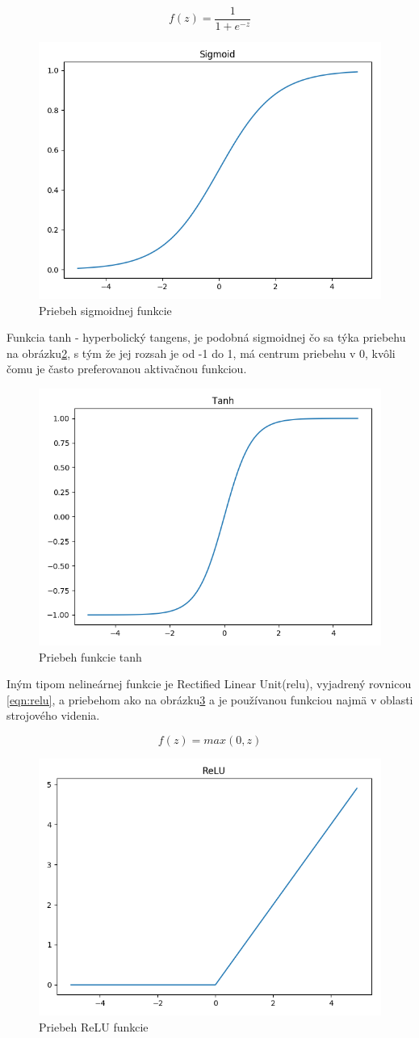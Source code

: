 \begin{equation}\label{eqn:sigmoid}
f(z) = \frac{1}{1 + e^{-z}}
\end{equation}

\begin{figure}[H]
	\centering
	\includegraphics[width=0.5\linewidth]{img/sigmoid}
	\caption{Priebeh sigmoidnej funkcie}
	\label{fig:sigmoid}
\end{figure}

Funkcia tanh - hyperbolický tangens, je podobná sigmoidnej čo sa týka priebehu na obrázku\ref{fig:tanh}, s tým že jej rozsah je od -1 do 1, má centrum priebehu v 0, kvôli čomu je často preferovanou aktivačnou funkciou.

\begin{figure}[H]
	\centering
	\includegraphics[width=0.5\linewidth]{img/tanh}
	\caption{Priebeh funkcie tanh}
	\label{fig:tanh}
\end{figure}

Iným tipom nelineárnej funkcie je Rectified Linear Unit(\acrshort{relu}), vyjadrený rovnicou \eqref{eqn:relu}, a priebehom ako na obrázku\ref{fig:relu} a je používanou funkciou najmä v oblasti strojového videnia.

\begin{equation}\label{eqn:relu}
f(z) = max(0, z)
\end{equation}

\begin{figure}[H]
	\centering
	\includegraphics[width=0.5\linewidth]{img/relu}
	\caption{Priebeh ReLU funkcie}
	\label{fig:relu}
\end{figure}

